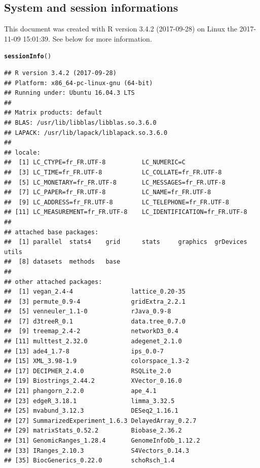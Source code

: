 \documentclass[12pt]{article}\usepackage[]{graphicx}\usepackage[]{color}
\makeatletter
\newcommand{\hlstd}[1]{\textcolor[rgb]{0.345,0.345,0.345}{#1}}%
\newcommand{\hlkwd}[1]{\textcolor[rgb]{0.737,0.353,0.396}{\textbf{#1}}}%
\newenvironment{kframe}{%
 \def\at@end@of@kframe{}%
 \ifinner\ifhmode%
  \def\at@end@of@kframe{\end{minipage}}%
  \begin{minipage}{\columnwidth}%
 \fi\fi%
 \def\FrameCommand##1{\hskip\@totalleftmargin \hskip-\fboxsep
 \colorbox{shadecolor}{##1}\hskip-\fboxsep
     \hskip-\linewidth \hskip-\@totalleftmargin \hskip\columnwidth}%
 \MakeFramed {\advance\hsize-\width
   \@totalleftmargin\z@ \linewidth\hsize
   \@setminipage}}%
 {\par\unskip\endMakeFramed%
 \at@end@of@kframe}
\newenvironment{knitrout}{}{} %
\numberwithin{figure}{section}
\makeatother
\begin{document}
  \subsection{System and session informations}
  This document was created with R version 3.4.2 (2017-09-28) on Linux the 2017-11-09 15:01:39. See below for more information.
\begin{knitrout}\tiny
{}\color{fgcolor}\begin{kframe}
\begin{alltt}
\hlkwd{sessionInfo}\hlstd{()}
\end{alltt}
\begin{verbatim}
## R version 3.4.2 (2017-09-28)
## Platform: x86_64-pc-linux-gnu (64-bit)
## Running under: Ubuntu 16.04.3 LTS
## 
## Matrix products: default
## BLAS: /usr/lib/libblas/libblas.so.3.6.0
## LAPACK: /usr/lib/lapack/liblapack.so.3.6.0
## 
## locale:
##  [1] LC_CTYPE=fr_FR.UTF-8          LC_NUMERIC=C                 
##  [3] LC_TIME=fr_FR.UTF-8           LC_COLLATE=fr_FR.UTF-8       
##  [5] LC_MONETARY=fr_FR.UTF-8       LC_MESSAGES=fr_FR.UTF-8      
##  [7] LC_PAPER=fr_FR.UTF-8          LC_NAME=fr_FR.UTF-8          
##  [9] LC_ADDRESS=fr_FR.UTF-8        LC_TELEPHONE=fr_FR.UTF-8     
## [11] LC_MEASUREMENT=fr_FR.UTF-8    LC_IDENTIFICATION=fr_FR.UTF-8
## 
## attached base packages:
##  [1] parallel  stats4    grid      stats     graphics  grDevices utils    
##  [8] datasets  methods   base     
## 
## other attached packages:
##  [1] vegan_2.4-4                lattice_0.20-35           
##  [3] permute_0.9-4              gridExtra_2.2.1           
##  [5] venneuler_1.1-0            rJava_0.9-8               
##  [7] d3treeR_0.1                data.tree_0.7.0           
##  [9] treemap_2.4-2              networkD3_0.4             
## [11] multtest_2.32.0            adegenet_2.1.0            
## [13] ade4_1.7-8                 ips_0.0-7                 
## [15] XML_3.98-1.9               colorspace_1.3-2          
## [17] DECIPHER_2.4.0             RSQLite_2.0               
## [19] Biostrings_2.44.2          XVector_0.16.0            
## [21] phangorn_2.2.0             ape_4.1                   
## [23] edgeR_3.18.1               limma_3.32.5              
## [25] mvabund_3.12.3             DESeq2_1.16.1             
## [27] SummarizedExperiment_1.6.3 DelayedArray_0.2.7        
## [29] matrixStats_0.52.2         Biobase_2.36.2            
## [31] GenomicRanges_1.28.4       GenomeInfoDb_1.12.2       
## [33] IRanges_2.10.3             S4Vectors_0.14.3          
## [35] BiocGenerics_0.22.0        schoRsch_1.4              

\end{verbatim}
\end{kframe}
\end{knitrout}
\end{document}
